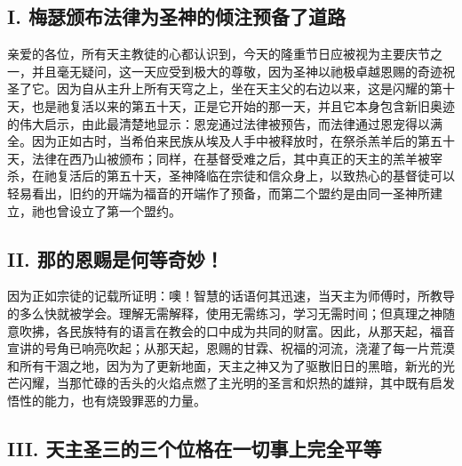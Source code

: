 \subsection{I. 梅瑟颁布法律为圣神的倾注预备了道路}

亲爱的各位，所有天主教徒的心都认识到，今天的隆重节日应被视为主要庆节之一，并且毫无疑问，这一天应受到极大的尊敬，因为圣神以祂极卓越恩赐的奇迹祝圣了它。因为自从主升上所有天穹之上，坐在天主父的右边以来，这是闪耀的第十天，也是祂复活以来的第五十天，正是它开始的那一天，并且它本身包含新旧奥迹的伟大启示，由此最清楚地显示：恩宠通过法律被预告，而法律通过恩宠得以满全。因为正如古时，当希伯来民族从埃及人手中被释放时，在祭杀羔羊后的第五十天，法律在西乃山被颁布；同样，在基督受难之后，其中真正的天主的羔羊被宰杀，在祂复活后的第五十天，圣神降临在宗徒和信众身上，以致热心的基督徒可以轻易看出，旧约的开端为福音的开端作了预备，而第二个盟约是由同一圣神所建立，祂也曾设立了第一个盟约。\par


\subsection{II. 那的恩赐是何等奇妙！}

因为正如宗徒的记载所证明：噢！智慧的话语何其迅速，当天主为师傅时，所教导的多么快就被学会。理解无需解释，使用无需练习，学习无需时间；但真理之神随意吹拂，各民族特有的语言在教会的口中成为共同的财富。因此，从那天起，福音宣讲的号角已响亮吹起；从那天起，恩赐的甘霖、祝福的河流，浇灌了每一片荒漠和所有干涸之地，因为为了更新地面，天主之神又为了驱散旧日的黑暗，新光的光芒闪耀，当那忙碌的舌头的火焰点燃了主光明的圣言和炽热的雄辩，其中既有启发悟性的能力，也有烧毁罪恶的力量。\par


\subsection{III. 天主圣三的三个位格在一切事上完全平等}

